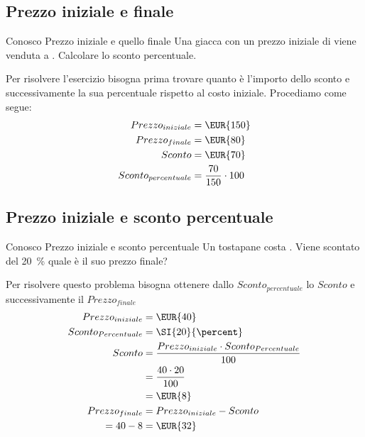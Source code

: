 \subsection{Prezzo iniziale e finale} 
 	\begin{esempiot}{Conosco Prezzo iniziale e quello finale}{}
 	Una giacca con un prezzo iniziale di  viene venduta a . Calcolare lo sconto percentuale. 
 \end{esempiot}
Per risolvere l'esercizio bisogna prima trovare quanto è l'importo dello sconto e successivamente  la sua percentuale rispetto al costo iniziale. Procediamo come segue:
 \begin{align*}
 	{Prezzo}_{iniziale}={}&\mbox{\EUR{150}}\\
 	{Prezzo}_{finale}={}&\mbox{\EUR{80}}\\
 	Sconto={}&\mbox{\EUR{70}}\\
 	{Sconto}_{percentuale}={}&\dfrac{70}{150}\cdot 100\\
 \end{align*}
\subsection{Prezzo iniziale e sconto percentuale}
	\begin{esempiot}{Conosco Prezzo iniziale e sconto percentuale}{}
Un tostapane costa . Viene scontato del \SI{20}{\percent} quale è il suo prezzo finale?
\end{esempiot}
Per risolvere questo problema bisogna ottenere dallo ${Sconto}_{percentuale}$  lo $Sconto$ e successivamente il ${Prezzo}_{finale}$
\begin{align*}
	{Prezzo}_{iniziale}={}&\mbox{\EUR{40}}\\
 	{Sconto}_{Percentuale}={}&\SI{20}{\percent}\\
 	Sconto={}&\dfrac{{Prezzo}_{iniziale}\cdot {Sconto}_{Percentuale} }{100}\\
 	={}&\dfrac{40\cdot 20 }{100}\\
 	={}&\mbox{\EUR{8}}\\
 	{Prezzo}_{finale}={}&{Prezzo}_{iniziale}-Sconto\\
 	=40-8={}&\mbox{\EUR{32}}\\
\end{align*}
